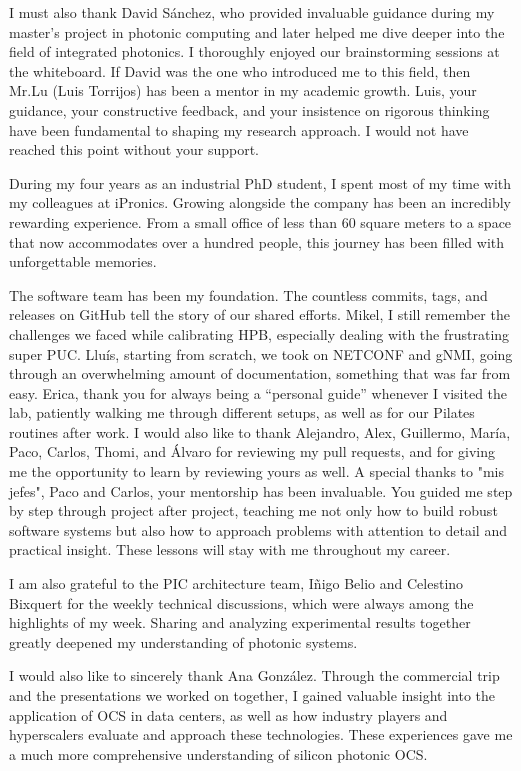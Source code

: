I must also thank David Sánchez, who provided invaluable guidance during my master’s project in photonic computing and later helped me dive deeper into the field of integrated photonics.
I thoroughly enjoyed our brainstorming sessions at the whiteboard.
If David was the one who introduced me to this field, then Mr.Lu (Luis Torrijos) has been a mentor in my academic growth.
Luis, your guidance, your constructive feedback, and your insistence on rigorous thinking have been fundamental to shaping my research approach.
I would not have reached this point without your support.

During my four years as an industrial PhD student, I spent most of my time with my colleagues at iPronics.
Growing alongside the company has been an incredibly rewarding experience.
From a small office of less than 60 square meters to a space that now accommodates over a hundred people, this journey has been filled with unforgettable memories.

The software team has been my foundation.
The countless commits, tags, and releases on GitHub tell the story of our shared efforts.
Mikel, I still remember the challenges we faced while calibrating HPB, especially dealing with the frustrating super PUC.
Lluís, starting from scratch, we took on NETCONF and gNMI, going through an overwhelming amount of documentation, something that was far from easy.
Erica, thank you for always being a “personal guide” whenever I visited the lab, patiently walking me through different setups, as well as for our Pilates routines after work.
I would also like to thank Alejandro, Alex, Guillermo, María, Paco, Carlos, Thomi, and Álvaro for reviewing my pull requests, and for giving me the opportunity to learn by reviewing yours as well.
A special thanks to "mis jefes", Paco and Carlos, your mentorship has been invaluable.
You guided me step by step through project after project, teaching me not only how to build robust software systems but also how to approach problems with attention to detail and practical insight.
These lessons will stay with me throughout my career.

I am also grateful to the PIC architecture team, Iñigo Belio and Celestino Bixquert for the weekly technical discussions, which were always among the highlights of my week.
Sharing and analyzing experimental results together greatly deepened my understanding of photonic systems.

I would also like to sincerely thank Ana González.
Through the commercial trip and the presentations we worked on together, I gained valuable insight into the application of OCS in data centers, as well as how industry players and hyperscalers evaluate and approach these technologies.
These experiences gave me a much more comprehensive understanding of silicon photonic OCS.

